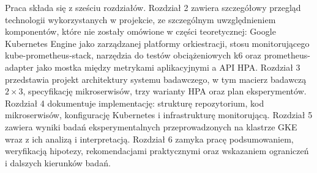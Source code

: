Praca składa się z sześciu rozdziałów. Rozdział 2 zawiera szczegółowy przegląd technologii wykorzystanych w projekcie, ze szczególnym uwzględnieniem komponentów, które nie zostały omówione w części teoretycznej: Google Kubernetes Engine jako zarządzanej platformy orkiestracji, stosu monitorującego kube-prometheus-stack, narzędzia do testów obciążeniowych k6 oraz prometheus-adapter jako mostka między metrykami aplikacyjnymi a API HPA. Rozdział 3 przedstawia projekt architektury systemu badawczego, w tym macierz badawczą $2 \times 3$, specyfikację mikroserwisów, trzy warianty HPA oraz plan eksperymentów. Rozdział 4 dokumentuje implementację: strukturę repozytorium, kod mikroserwisów, konfigurację Kubernetes i infrastrukturę monitorującą. Rozdział 5 zawiera wyniki badań eksperymentalnych przeprowadzonych na klastrze GKE wraz z ich analizą i interpretacją. Rozdział 6 zamyka pracę podsumowaniem, weryfikacją hipotezy, rekomendacjami praktycznymi oraz wskazaniem ograniczeń i dalszych kierunków badań.

